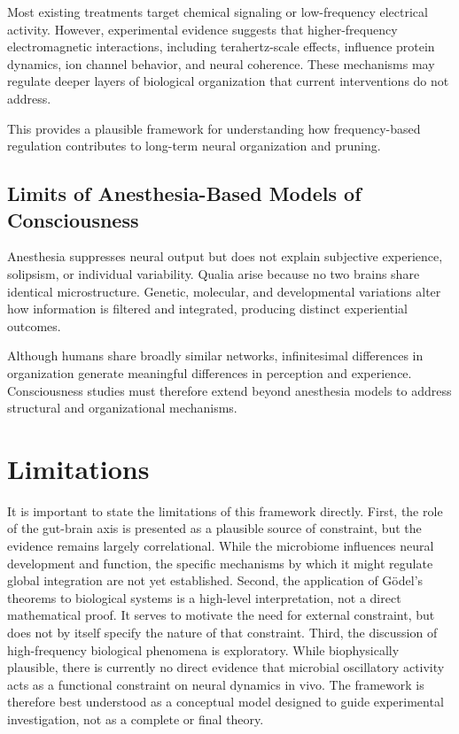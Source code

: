 \documentclass[12pt,letterpaper]{article}
\begin{document}
Most existing treatments target chemical signaling or low-frequency electrical activity. However, experimental evidence suggests that higher-frequency electromagnetic interactions, including terahertz-scale effects, influence protein dynamics, ion channel behavior, and neural coherence. These mechanisms may regulate deeper layers of biological organization that current interventions do not address.

This provides a plausible framework for understanding how frequency-based regulation contributes to long-term neural organization and pruning.

\subsection{Limits of Anesthesia-Based Models of Consciousness}

Anesthesia suppresses neural output but does not explain subjective experience, solipsism, or individual variability. Qualia arise because no two brains share identical microstructure. Genetic, molecular, and developmental variations alter how information is filtered and integrated, producing distinct experiential outcomes.

Although humans share broadly similar networks, infinitesimal differences in organization generate meaningful differences in perception and experience. Consciousness studies must therefore extend beyond anesthesia models to address structural and organizational mechanisms.

\section{Limitations}

It is important to state the limitations of this framework directly. First, the role of the gut-brain axis is presented as a plausible source of constraint, but the evidence remains largely correlational. While the microbiome influences neural development and function, the specific mechanisms by which it might regulate global integration are not yet established. Second, the application of Gödel's theorems to biological systems is a high-level interpretation, not a direct mathematical proof. It serves to motivate the need for external constraint, but does not by itself specify the nature of that constraint. Third, the discussion of high-frequency biological phenomena is exploratory. While biophysically plausible, there is currently no direct evidence that microbial oscillatory activity acts as a functional constraint on neural dynamics in vivo. The framework is therefore best understood as a conceptual model designed to guide experimental investigation, not as a complete or final theory.
\end{document}
